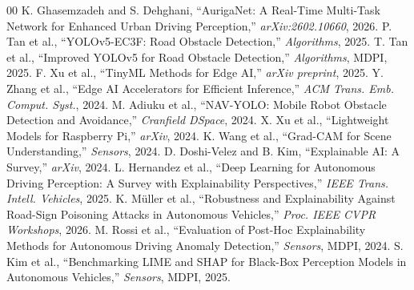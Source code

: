 \documentclass[conference]{IEEEtran}
\begin{document}
\begin{thebibliography}{00}
 K. Ghasemzadeh and S. Dehghani, ``AurigaNet: A Real-Time Multi-Task Network for Enhanced Urban Driving Perception,'' \textit{arXiv:2602.10660}, 2026.
 P. Tan et al., ``YOLOv5-EC3F: Road Obstacle Detection,'' \textit{Algorithms}, 2025.
 T. Tan et al., ``Improved YOLOv5 for Road Obstacle Detection,'' \textit{Algorithms}, MDPI, 2025.
 F. Xu et al., ``TinyML Methods for Edge AI,'' \textit{arXiv preprint}, 2025.
 Y. Zhang et al., ``Edge AI Accelerators for Efficient Inference,'' \textit{ACM Trans. Emb. Comput. Syst.}, 2024.
 M. Adiuku et al., ``NAV-YOLO: Mobile Robot Obstacle Detection and Avoidance,'' \textit{Cranfield DSpace}, 2024.
 X. Xu et al., ``Lightweight Models for Raspberry Pi,'' \textit{arXiv}, 2024.
 K. Wang et al., ``Grad-CAM for Scene Understanding,'' \textit{Sensors}, 2024.
 D. Doshi-Velez and B. Kim, ``Explainable AI: A Survey,'' \textit{arXiv}, 2024.
 L. Hernandez et al., ``Deep Learning for Autonomous Driving Perception: A Survey with Explainability Perspectives,'' \textit{IEEE Trans. Intell. Vehicles}, 2025.
 K. M\"uller et al., ``Robustness and Explainability Against Road-Sign Poisoning Attacks in Autonomous Vehicles,'' \textit{Proc. IEEE CVPR Workshops}, 2026.
 M. Rossi et al., ``Evaluation of Post-Hoc Explainability Methods for Autonomous Driving Anomaly Detection,'' \textit{Sensors}, MDPI, 2024.
 S. Kim et al., ``Benchmarking LIME and SHAP for Black-Box Perception Models in Autonomous Vehicles,'' \textit{Sensors}, MDPI, 2025.
\end{thebibliography}
\end{document}
